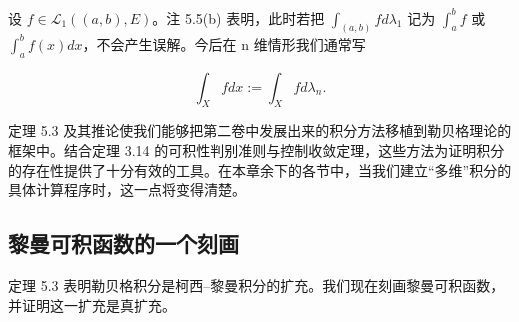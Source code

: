 \begin{remark}
\begin{items}
\end{items}

设 $ f \in \mathcal{L}_{1}((a,b),E) $。注 5.5(b) 表明，此时若把 $ \int_{(a,b)} f d\lambda_{1} $ 记为 $ \int_{a}^{b} f $ 或 $ \int_{a}^{b} f(x) dx $，不会产生误解。今后在 n 维情形我们通常写

\[
\int_{X} f dx := \int_{X} f d\lambda_{n} .
\]

定理 5.3 及其推论使我们能够把第二卷中发展出来的积分方法移植到勒贝格理论的框架中。结合定理 3.14 的可积性判别准则与控制收敛定理，这些方法为证明积分的存在性提供了十分有效的工具。在本章余下的各节中，当我们建立“多维”积分的具体计算程序时，这一点将变得清楚。

\end{remark}

\subsection*{黎曼可积函数的一个刻画}

定理 5.3 表明勒贝格积分是柯西–黎曼积分的扩充。我们现在刻画黎曼可积函数，并证明这一扩充是真扩充。

